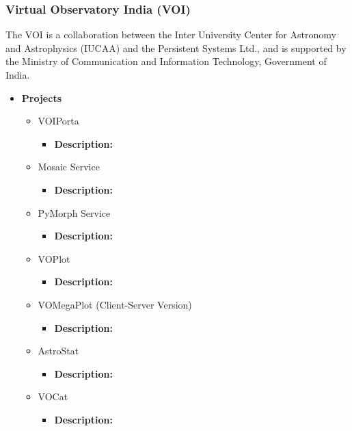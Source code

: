 \subsubsection{Virtual Observatory India (VOI)}
The VOI is a collaboration between the Inter University Center for Astronomy
and Astrophysics (IUCAA) and the Persistent Systems Ltd., and is supported by
the Ministry of Communication and Information Technology, Government of India.

\begin{itemize}
\item \textbf{Projects}
	\begin{itemize}
		\item VOIPorta
            \begin{itemize}
                \item \textbf{Description:}
            \end{itemize}
		\item Mosaic Service
            \begin{itemize}
                \item \textbf{Description:}
            \end{itemize}
		\item PyMorph Service
            \begin{itemize}
                \item \textbf{Description:}
            \end{itemize}
		\item VOPlot
            \begin{itemize}
                \item \textbf{Description:}
            \end{itemize}
		\item VOMegaPlot (Client-Server Version)
            \begin{itemize}
                \item \textbf{Description:}
            \end{itemize}
		\item AstroStat
            \begin{itemize}
                \item \textbf{Description:}
            \end{itemize}
		\item VOCat
            \begin{itemize}
                \item \textbf{Description:}
            \end{itemize}

\end{itemize}
\end{itemize}
